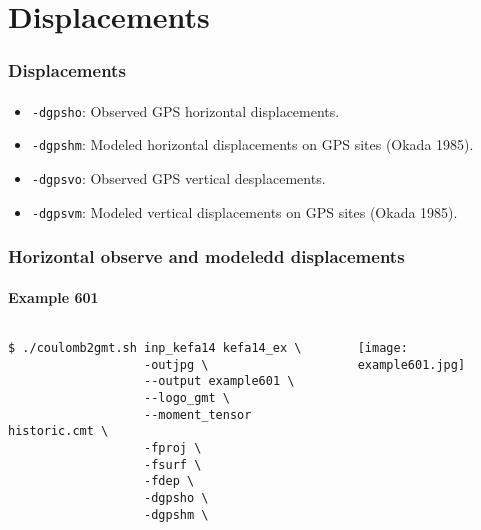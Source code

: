 \section[Displacements]{Displacements}

\graphicspath{{Chapter6/Figs/}}

\begin{frame}
  \frametitle{Displacements}
  \framesubtitle{}
  \label{fr6:terr_sat_ext}

\begin{itemize}
\item
  \texttt{-dgpsho}: Observed GPS horizontal displacements.
\item
  \texttt{-dgpshm}: Modeled horizontal displacements on GPS sites (Okada
  1985).
\item
  \texttt{-dgpsvo}: Observed GPS vertical desplacements.
\item
  \texttt{-dgpsvm}: Modeled vertical displacements on GPS sites (Okada
  1985).
\end{itemize}

\end{frame}
\note{}

\begin{frame}[t,fragile]
  \frametitle{Horizontal observe and modeledd displacements}
  \framesubtitle{Example 601}
  \label{ch5fr:ex601}
\begin{columns}[t]
  \begin{column}{.5\textwidth}
\begin{scriptsize}
\begin{verbatim}
$ ./coulomb2gmt.sh inp_kefa14 kefa14_ex \
                   -outjpg \ 
                   --output example601 \
                   --logo_gmt \
                   --moment_tensor historic.cmt \
                   -fproj \
                   -fsurf \
                   -fdep \
                   -dgpsho \
                   -dgpshm \ 
\end{verbatim}
\end{scriptsize}

  \end{column}
  \begin{column}{.5\textwidth}

\centering
  \texttt{[image: example601.jpg]}
  \end{column}
\end{columns}

\end{frame}
\note{}

